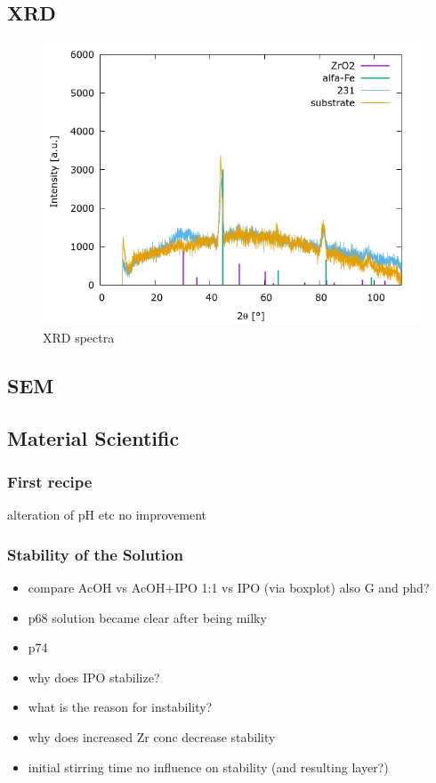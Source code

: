 
\subsection{XRD}
\begin{figure}
	\centering
	\includegraphics[width=\picwidth]{Pics/xrd.png}
	\caption{XRD spectra}
	\label{fig:xrd}
\end{figure}

\subsection{SEM}

\subsection{Material Scientific}
\subsubsection{First recipe} 
alteration of pH etc no improvement 

\subsubsection{Stability of the Solution}
\begin{itemize}
    \item compare AcOH vs AcOH+IPO 1:1 vs IPO (via boxplot) also G and phd? 
    \item p68 solution became clear after being milky 
    \item p74 
    \item why does IPO stabilize? 
    \item what is the reason for instability? 
    \item why does increased Zr conc decrease stability
    \item initial stirring time no influence on stability (and resulting layer?)
\end{itemize}

